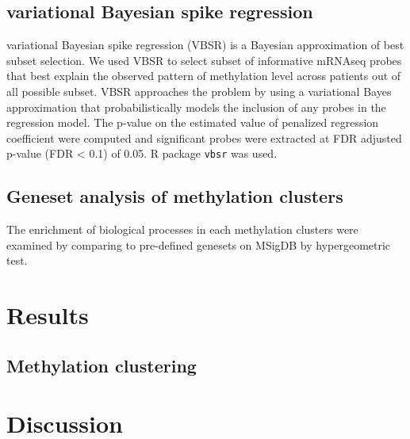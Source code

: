 \documentclass{article}
\begin{document}
\subsection{variational Bayesian spike regression}
variational Bayesian spike regression (VBSR) \cite{logsdon2012novel} is a Bayesian approximation of best subset selection. We used VBSR to select subset of informative mRNAseq probes that best explain the observed pattern of methylation level across patients out of all possible subset. VBSR approaches the problem by using a variational Bayes approximation that probabilistically models the inclusion of any probes in the regression model. The p-value on the estimated value of penalized regression coefficient were computed and significant probes were extracted at FDR adjusted p-value (FDR < 0.1) of 0.05. R package \texttt{vbsr} was used. 

\subsection{Geneset analysis of methylation clusters}
The enrichment of biological processes in each methylation clusters were examined by comparing to pre-defined genesets on MSigDB by hypergeometric test. 

\section{Results}

\subsection{Methylation clustering}

\section{Discussion}



\end{document}
